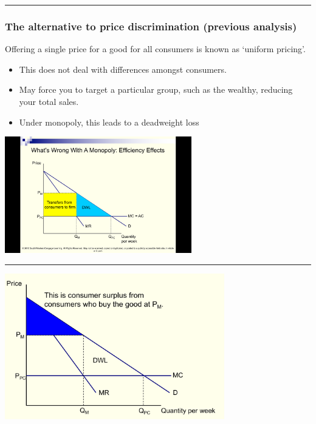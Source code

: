\documentclass[]{article}
\providecommand{\tightlist}{%
  \setlength{\itemsep}{0pt}\setlength{\parskip}{0pt}}
\begin{document}
\begin{center}\rule{0.5\linewidth}{\linethickness}\end{center}

\hypertarget{the-alternative-to-price-discrimination-previous-analysis}{%
\subsubsection{The alternative to price discrimination (previous
analysis)}\label{the-alternative-to-price-discrimination-previous-analysis}}

Offering a single price for a good for all consumers is known as
`uniform pricing'.

\begin{itemize}
\tightlist
\item
  This does not deal with differences amongst consumers.
\item
  May force you to target a particular group, such as the wealthy,
  reducing your total sales.
\item
  Under monopoly, this leads to a deadweight loss
\end{itemize}

\includegraphics[height=2in]{picsfigs/dwl3.png}

\begin{center}\rule{0.5\linewidth}{\linethickness}\end{center}

\includegraphics[height=2.5in]{picsfigs/ppd1.png}
\end{document}
